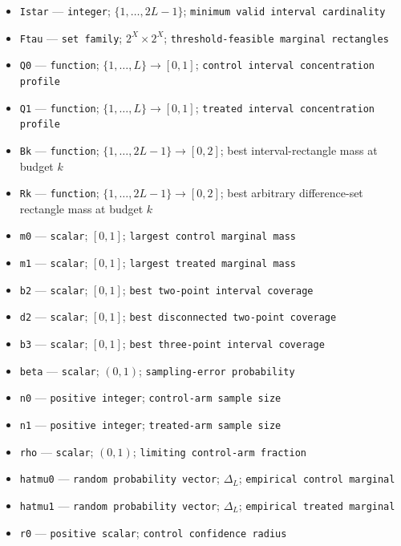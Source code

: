 \documentclass{article}
\begin{document}
\begin{itemize}
  \item \texttt{Istar} --- \texttt{integer}; \(\{1,\ldots,2L-1\}\); \texttt{minimum valid interval cardinality}
  \item \texttt{Ftau} --- \texttt{set family}; \(2^X\times2^X\); \texttt{threshold-\allowbreak{}feasible marginal rectangles}
  \item \texttt{Q0} --- \texttt{function}; \(\{1,\ldots,L\}\to[0,1]\); \texttt{control interval concentration profile}
  \item \texttt{Q1} --- \texttt{function}; \(\{1,\ldots,L\}\to[0,1]\); \texttt{treated interval concentration profile}
  \item \texttt{Bk} --- \texttt{function}; \(\{1,\ldots,2L-1\}\to[0,2]\); best interval-rectangle mass at budget \(k\)
  \item \texttt{Rk} --- \texttt{function}; \(\{1,\ldots,2L-1\}\to[0,2]\); best arbitrary difference-set rectangle mass at budget \(k\)
  \item \texttt{m0} --- \texttt{scalar}; \([0,1]\); \texttt{largest control marginal mass}
  \item \texttt{m1} --- \texttt{scalar}; \([0,1]\); \texttt{largest treated marginal mass}
  \item \texttt{b2} --- \texttt{scalar}; \([0,1]\); \texttt{best two-\allowbreak{}point interval coverage}
  \item \texttt{d2} --- \texttt{scalar}; \([0,1]\); \texttt{best disconnected two-\allowbreak{}point coverage}
  \item \texttt{b3} --- \texttt{scalar}; \([0,1]\); \texttt{best three-\allowbreak{}point interval coverage}
  \item \texttt{beta} --- \texttt{scalar}; \((0,1)\); \texttt{sampling-\allowbreak{}error probability}
  \item \texttt{n0} --- \texttt{positive integer}; \texttt{control-\allowbreak{}arm sample size}
  \item \texttt{n1} --- \texttt{positive integer}; \texttt{treated-\allowbreak{}arm sample size}
  \item \texttt{rho} --- \texttt{scalar}; \((0,1)\); \texttt{limiting control-\allowbreak{}arm fraction}
  \item \texttt{hatmu0} --- \texttt{random probability vector}; \(\Delta_L\); \texttt{empirical control marginal}
  \item \texttt{hatmu1} --- \texttt{random probability vector}; \(\Delta_L\); \texttt{empirical treated marginal}
  \item \texttt{r0} --- \texttt{positive scalar}; \texttt{control confidence radius}

\end{itemize}
\end{document}
